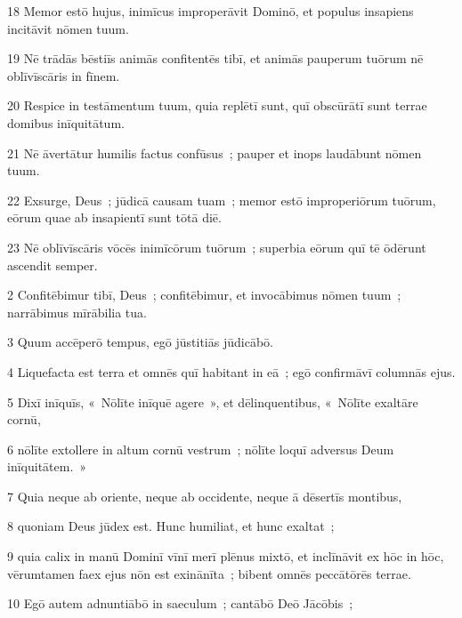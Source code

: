 \psalmVerse
  {\phantom{0}18}
  {Memor estō hujus, inimīcus improperāvit Dominō, et populus insapiens incitāvit nōmen tuum.}


\psalmVerse
  {\phantom{0}19}
  {Nē trādās bēstiīs animās confitentēs tibī, et animās pauperum tuōrum nē oblīvīscāris in fīnem.}


\psalmVerse
  {\phantom{0}20}
  {Respice in testāmentum tuum, quia replētī sunt, quī obscūrātī sunt terrae domibus inīquitātum.}


\psalmVerse
  {\phantom{0}21}
  {Nē āvertātur humilis factus confūsus~; pauper et inops laudābunt nōmen tuum.}


\psalmVerse
  {\phantom{0}22}
  {Exsurge, Deus~; jūdicā causam tuam~; memor estō improperiōrum tuōrum, eōrum quae ab insapientī sunt tōtā diē.}


\psalmVerse
  {\phantom{0}23}
  {Nē oblīvīscāris vōcēs inimīcōrum tuōrum~; superbia eōrum quī tē ōdērunt ascendit semper.}




\psalmVerse
  {\phantom{00}2}
  {Confitēbimur tibī, Deus~; confitēbimur, et invocābimus nōmen tuum~; narrābimus mīrābilia tua.}


\psalmVerse
  {\phantom{00}3}
  {Quum accēperō tempus, egō jūstitiās jūdicābō.}


\psalmVerse
  {\phantom{00}4}
  {Liquefacta est terra et omnēs quī habitant in eā~; egō confirmāvī columnās ejus.}


\psalmVerse
  {\phantom{00}5}
  {Dixī inīquīs, «~Nōlīte inīquē agere~», et dēlinquentibus, «~Nōlīte exaltāre cornū,}


\psalmVerse
  {\phantom{00}6}
  {nōlīte extollere in altum cornū vestrum~; nōlīte loquī adversus Deum inīquitātem.~»}


\psalmVerse
  {\phantom{00}7}
  {Quia neque ab oriente, neque ab occidente, neque ā dēsertīs montibus,}


\psalmVerse
  {\phantom{00}8}
  {quoniam Deus jūdex est. Hunc humiliat, et hunc exaltat~;}


\psalmVerse
  {\phantom{00}9}
  {quia calix in manū Dominī vīnī merī plēnus mixtō, et inclīnāvit ex hōc in hōc, vērumtamen faex ejus nōn est exinānīta~; bibent omnēs peccātōrēs terrae.}


\psalmVerse
  {\phantom{0}10}
  {Egō autem adnuntiābō in saeculum~; cantābō Deō Jācōbis~;}


